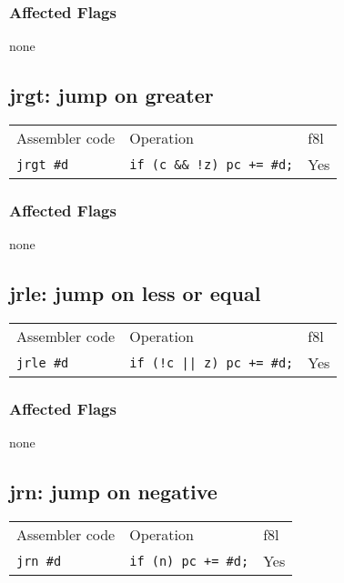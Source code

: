 \documentclass{book}
\begin{document}
\subsubsection*{Affected Flags}

none


\subsection{jrgt: jump on greater}

\begin{tabular}{l l l}
Assembler code    & Operation                        & f8l \\
\texttt{jrgt \#d} & \texttt{if (c \&\& !z) pc += \#d;} & Yes \\
\end{tabular}

\subsubsection*{Affected Flags}

none

\subsection{jrle: jump on less or equal}

\begin{tabular}{l l l}
Assembler code    & Operation                        & f8l \\
\texttt{jrle \#d} & \texttt{if (!c || z) pc += \#d;} & Yes \\
\end{tabular}

\subsubsection*{Affected Flags}

none


\subsection{jrn: jump on negative}

\begin{tabular}{l l l}
Assembler code   & Operation                  & f8l \\
\texttt{jrn \#d} & \texttt{if (n) pc += \#d;} & Yes \\
\end{tabular}
\end{document}
